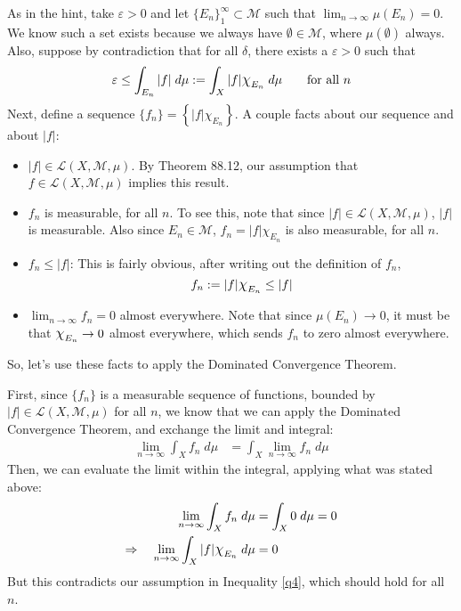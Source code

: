\documentclass[12pt]{article}
\theoremstyle{plain}
\theoremstyle{definition}
\theoremstyle{remark}
\newcommand*{\Chi}{\mbox{\large$\chi$}} %
\begin{document}
\begin{enumerate}
As in the hint, take $\varepsilon>0$ and let $\{E_n\}^\infty_1 \subset \mathscr{M}$ such that $\lim_{n\rightarrow\infty} \mu(E_n)=0$. We know such a set exists because we always have $\emptyset \in \mathscr{M}$, where $\mu(\emptyset)$ always. Also, suppose by contradiction that for all $\delta$, there exists a $\varepsilon>0$ such that 
\begin{equation}
    \label{q4}
    \varepsilon\leq \int_{E_n} |f| \; d\mu :=
    \int_X |f|\Chi_{E_n} \; d\mu
    \qquad\text{for all $n$}
\end{equation}
Next, define a sequence $\{f_n\}=\left\{|f|\chi_{E_n}\right\}$. A couple facts about our sequence and about $|f|$:
\begin{itemize}
    \item $|f|\in\mathscr{L}(X,\mathscr{M},\mu)$. By Theorem 88.12, our assumption that $f\in\mathscr{L}(X,\mathscr{M},\mu)$ implies this result.
    \item $f_n$ is measurable, for all $n$. To see this, note that since $|f|\in\mathscr{L}(X,\mathscr{M},\mu)$, $|f|$ is measurable. Also since $E_n\in\mathscr{M}$, $f_n = |f|\chi_{E_n}$ is also measurable, for all $n$.
    \item $f_n \leq |f|$: This is fairly obvious, after writing out the definition of $f_n$, 
\begin{equation}
    \label{dtcapply}
    f_n := |f|\Chi_{E_n}\leq |f|
\end{equation}
    \item $\lim_{n\rightarrow\infty}f_n=0$ almost everywhere. Note that since $\mu(E_n)\rightarrow 0$, it must be that $\Chi_{E_n}\rightarrow 0$ almost everywhere, which sends $f_n$ to zero almost everywhere.
\end{itemize}
So, let's use these facts to apply the Dominated Convergence Theorem. 

First, since $\{f_n\}$ is a measurable sequence of functions, bounded by $|f|\in\mathscr{L}(X,\mathscr{M},\mu)$ for all $n$, we know that we can apply the Dominated Convergence Theorem, and exchange the limit and integral:
\begin{align*}
    \lim_{n\rightarrow\infty} \int_X f_n \; d\mu&=
    \int_X \lim_{n\rightarrow\infty}f_n \; d\mu  
\end{align*}
Then, we can evaluate the limit within the integral, applying what was stated above:
\begin{align*}
    \lim_{n\rightarrow\infty} \int_X f_n \; d\mu &=
    \int_X 0 \; d\mu = 0 \\ 
    \Rightarrow\quad
    \lim_{n\rightarrow\infty} \int_X |f|\Chi_{E_n} \; 
    d\mu &= 0
\end{align*}
But this contradicts our assumption in Inequality \ref{q4}, which should hold for all $n$.



\end{enumerate}
\end{document}
